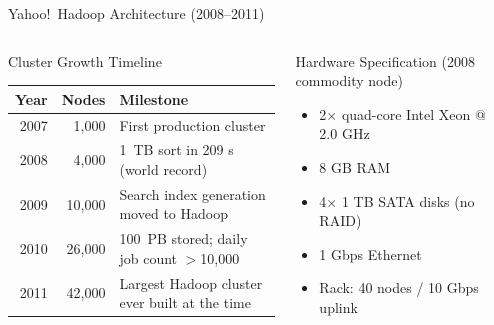 \documentclass[aspectratio=169,10pt]{beamer}
\begin{document}
\begin{frame}{Yahoo!\ Hadoop Architecture (2008--2011)}
  \begin{columns}[T]
      \begin{block}{Cluster Growth Timeline}
        \renewcommand{\arraystretch}{1.25}
        \begin{tabular}{@{}rrl@{}}
          \toprule
          \textbf{Year} & \textbf{Nodes} & \textbf{Milestone} \\
          \midrule
          2007 & 1{,}000   & First production cluster \\
          2008 & 4{,}000   & 1~TB sort in 209 s (world record) \\
          2009 & 10{,}000  & Search index generation moved to Hadoop \\
          2010 & 26{,}000  & 100~PB stored; daily job count $>$10{,}000 \\
          2011 & 42{,}000  & Largest Hadoop cluster ever built at the time \\
          \bottomrule
        \end{tabular}
      \end{block}
      \vspace{5pt}
      \begin{exampleblock}{Hardware Specification (2008 commodity node)}
        \begin{itemize}\setlength\itemsep{0pt}
          \item 2$\times$ quad-core Intel Xeon @ 2.0 GHz
          \item 8 GB RAM
          \item 4$\times$ 1 TB SATA disks (no RAID)
          \item 1 Gbps Ethernet
          \item Rack: 40 nodes / 10 Gbps uplink
        \end{itemize}
      \end{exampleblock}

      \begin{center}
\end{center}
\end{columns}
\end{frame}
\end{document}
